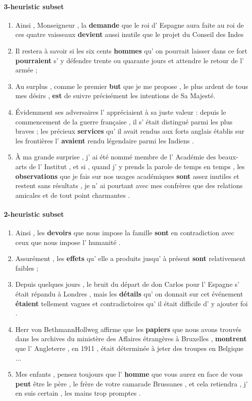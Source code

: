 \paragraph{3-heuristic subset}
\begin{enumerate}[itemsep=0pt,label=\arabic*).]
\item Ainsi , Monseigneur , la \textbf{demande} que le roi d' Espagne aura faite au roi de ces quatre vaisseaux \textbf{devient} aussi inutile que le projet du Conseil des Indes 
\item Il restera à savoir si les six cents \textbf{hommes} qu' on pourrait laisser dans ce fort \textbf{pourraient} s' y défendre trente ou quarante jours et attendre le retour de l' armée ;
\item Au surplus , comme le premier \textbf{but} que je me propose , le plus ardent de tous mes désirs , \textbf{est} de suivre précisément les intentions de Sa Majesté.
\item Évidemment ses adversaires l' appréciaient à sa juste valeur : depuis le commencement de la guerre française , il s' était distingué parmi les plus braves ; les précieux \textbf{services} qu' il avait rendus aux forts anglais établis sur les frontières l' \textbf{avaient} rendu légendaire parmi les Indiens .
\item À ma grande surprise , j' ai été nommé membre de l' Académie des beaux-arts de l' Institut , et si , quand j' y prends la parole de temps en temps , les \textbf{observations} que je fais sur nos usages académiques \textbf{sont} assez inutiles et restent sans résultats , je n' ai pourtant avec mes confrères que des relations amicales et de tout point charmantes .
\end{enumerate}

\paragraph{2-heuristic subset}
\begin{enumerate}[itemsep=0pt,label=\arabic*).]
\item  Ainsi , les \textbf{devoirs} que nous impose la famille \textbf{sont} en contradiction avec ceux que nous impose l' humanité .
\item Assurément , les \textbf{effets} qu' elle a produits jusqu' à présent \textbf{sont} relativement faibles ;
\item Depuis quelques jours , le bruit du départ de don Carlos pour l' Espagne s' était répandu à Londres , mais les \textbf{détails} qu' on donnait sur cet événement \textbf{étaient} tellement vagues et contradictoires qu' il était difficile d' y ajouter foi .
\item Herr von Bethmann\-Hollweg affirme que les \textbf{papiers} que nous avons trouvés dans les archives du ministère des Affaires étrangères à Bruxelles , \textbf{montrent} que l' Angleterre , en 1911 , était déterminée à jeter des troupes en Belgique ... 
\item Mes enfants , pensez toujours que l' \textbf{homme} que vous aurez en face de vous \textbf{peut} être le père , le frère de votre camarade Brussanes , et cela retiendra , j' en suis certain , les mains trop promptes .
\end{enumerate}


